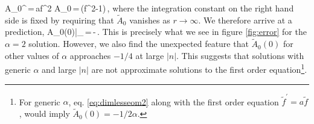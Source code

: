 \be
\tilde A_0^\prime\,=\,a\tilde f^2 \quad{}  \quad 
\tilde A_0\,=\,\left(\tilde f^2-1\right)\,,
\ee
where the integration constant on the right hand side is fixed by requiring that $\tilde A_0$ vanishes as $r\to\infty$. 
We therefore arrive at a prediction,
\be
\tilde A_0(0)\big|_{}\,=\,-\,.
\ee
This is precisely what we see in figure \ref{fig:error} for the $\alpha=2$ solution. However, we also find the unexpected feature that $\tilde A_0(0)$ for other values of $\alpha$ approaches $-1/4$ at large $|n|$. This suggests  that solutions with generic $\alpha$ and large $|n|$ are not approximate  solutions to the first order equation\footnote{For generic $\alpha$, eq. \eqref{eq:dimlesseom2} along with the first order equation $\tilde f^\prime = a \tilde f$, would imply $\tilde A_0(0)=-1/2\alpha$. }.
